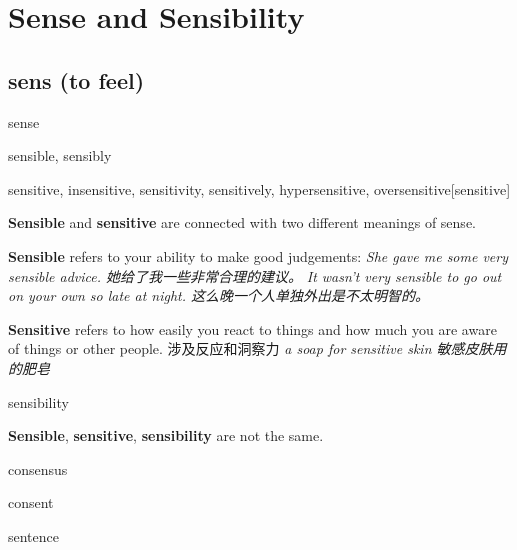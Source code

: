 \chapter{Sense and Sensibility}

\section{sens (to feel)}

\begin{DefWord}{sense}
\end{DefWord}

\begin{DefWord}{sensible, sensibly}
\end{DefWord}

\begin{DefWord}{sensitive, insensitive, sensitivity, sensitively, hypersensitive, oversensitive}[sensitive]
\end{DefWord}

\begin{remark}
    \textbf{Sensible} and \textbf{sensitive} are connected with two different meanings of sense.

    \textbf{Sensible} refers to your ability to make good judgements:
    \textit{She gave me some very sensible advice. 她给了我一些非常合理的建议。}
    \textit{It wasn’t very sensible to go out on your own so late at night. 这么晚一个人单独外出是不太明智的。}

    \textbf{Sensitive} refers to how easily you react to things and how much you are aware of things or other people. 涉及反应和洞察力
    \textit{a soap for sensitive skin 敏感皮肤用的肥皂}
\end{remark}

\begin{DefWord}{sensibility}
\end{DefWord}

\begin{remark}
    \textbf{Sensible}, \textbf{sensitive}, \textbf{sensibility} are not the same.

    
\end{remark}

\begin{DefWord}{consensus}
\end{DefWord}

\begin{DefWord}{consent}
\end{DefWord}

\begin{DefWord}{sentence}
\end{DefWord}


